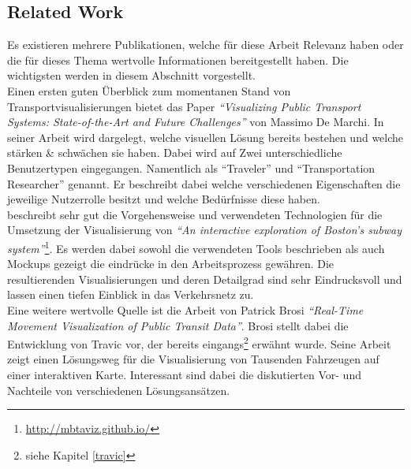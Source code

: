 \subsection{Related Work}
\label{sub:related_work}
  Es existieren mehrere Publikationen, welche für diese Arbeit Relevanz haben oder die für dieses Thema wertvolle Informationen bereitgestellt haben. Die wichtigsten werden in diesem Abschnitt vorgestellt.\\

  Einen ersten guten Überblick zum momentanen Stand von Transportvisualisierungen bietet das Paper \textit{"`Visualizing Public Transport Systems: State-of-the-Art and Future Challenges"'}\parencite{marchi} von Massimo De Marchi. In seiner Arbeit wird dargelegt, welche visuellen Lösung bereits bestehen und welche stärken \& schwächen sie haben. Dabei wird auf Zwei unterschiedliche Benutzertypen eingegangen. Namentlich als "`Traveler"' und "`Transportation Researcher"' genannt. Er beschreibt dabei welche verschiedenen Eigenschaften die jeweilige Nutzerrolle besitzt und welche Bedürfnisse diese haben.\\ 


  \parencite{mbtaviz} beschreibt sehr gut die Vorgehensweise und verwendeten Technologien für die Umsetzung der Visualisierung von \textit{"`An interactive exploration of Boston's subway system"'}\footnote{\url{http://mbtaviz.github.io/}}. Es werden dabei sowohl die verwendeten Tools beschrieben als auch Mockups gezeigt die eindrücke in den Arbeitsprozess gewähren. Die resultierenden Visualisierungen und deren Detailgrad sind sehr Eindrucksvoll und lassen einen tiefen Einblick in das Verkehrsnetz zu.\\

  Eine weitere wertvolle Quelle ist die Arbeit von Patrick Brosi \textit{"`Real-Time Movement Visualization of Public Transit Data"'}\parencite{brosi}. Brosi stellt dabei die Entwicklung von Travic vor, der bereits eingangs\footnote{siehe Kapitel \ref{travic}} erwähnt wurde. Seine Arbeit zeigt einen Lösungsweg für die Visualisierung von Tausenden Fahrzeugen auf einer interaktiven Karte. Interessant sind dabei die diskutierten Vor- und Nachteile von verschiedenen Lösungsansätzen.


